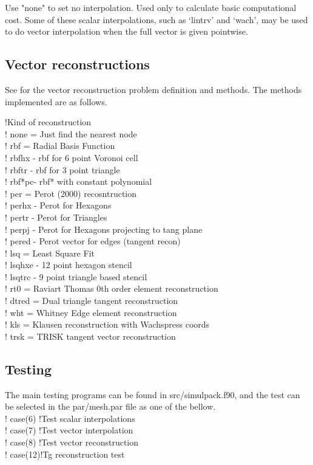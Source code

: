 \documentclass[a4paper,10pt]{article}
\begin{document}
    Use "none" to set no interpolation. Used only to calculate basic computational cost. Some of these scalar interpolations, such as `lintrv' and `wach', may be used to do vector interpolation when the full vector is given pointwise.

\subsection{Vector reconstructions}

See \cite{Peixoto2014} for the vector reconstruction problem definition and methods. The methods implemented are as follows.

    !Kind of reconstruction\\
    !  none   = Just find the nearest node\\
    !  rbf    = Radial Basis Function\\
    !     rbfhx  - rbf for 6 point Voronoi cell\\
    !     rbftr  - rbf for 3 point triangle\\
    !     rbf*pc- rbf* with constant polynomial\\
    !  per    = Perot (2000) recosntruction\\
    !     perhx  - Perot for Hexagons\\
    !     pertr  - Perot for Triangles\\
    !     perpj  - Perot for Hexagons projecting to tang plane\\
    !     pered  - Perot vector for edges (tangent recon)\\
    !  lsq    = Least Square Fit\\
    !     lsqhxe - 12 point hexagon stencil\\
    !     lsqtrc - 9 point triangle based stencil\\
    !  rt0    = Raviart Thomas 0th order element reconstruction\\
    !  dtred  = Dual triangle tangent reconstruction\\
    !  wht    = Whitney Edge element reconstruction\\
    !  kls    = Klausen reconstruction with Wachspress coords\\
    !  trsk   = TRISK tangent vector reconstruction\\

\subsection{Testing}
The main testing programs can be found in src/simulpack.f90, and the test can be selected in the par/mesh.par file as one of the bellow.\\
!  case(6) !Test scalar interpolations\\
!  case(7) !Test vector interpolation\\
!  case(8) !Test vector reconstruction\\
!  case(12)!Tg reconstruction test\\
\end{document}
